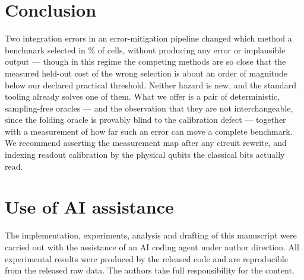 \documentclass[10pt,conference]{IEEEtran}
\begin{document}
\section{Conclusion}
Two integration errors in an error-mitigation pipeline changed which method a benchmark selected in
\FlipRateAllPct\% of cells, without producing any error or implausible output --- though in this
regime the competing methods are so close that the measured held-out cost of the wrong selection is
about an order of magnitude below our declared practical threshold. Neither hazard is new, and the standard tooling
already solves one of them. What we offer is a pair of deterministic, sampling-free oracles --- and
the observation that they are not interchangeable, since the folding oracle is provably blind to the
calibration defect --- together with a measurement of how far such an error can move a complete
benchmark. We recommend asserting the measurement map after any circuit rewrite, and indexing
readout calibration by the physical qubits the classical bits actually read.

\section*{Use of AI assistance}
The implementation, experiments, analysis and drafting of this manuscript were carried out with the
assistance of an AI coding agent under author direction. All experimental results were produced by
the released code and are reproducible from the released raw data. The authors take full
responsibility for the content.

\balance


\end{document}
